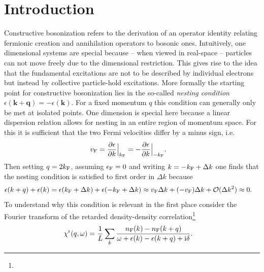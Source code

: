 \documentclass[english, parskip=full]{scrartcl}
\title{\titel}
\author{\autor}
\date{\today}
\begin{document}
\maketitle  %


\section{Introduction}
Constructive bosonization refers to the derivation of an operator identity relating fermionic creation and annihilation operators to bosonic ones.
Intuitively, one dimensional systems are special because -- when viewed in real-space -- particles can not move freely due to the dimensional restriction.
This gives rise to the idea that the fundamental excitations are not to be described by individual electrons but instead by collective particle-hold excitations.
More formally the starting point for constructive bosonization lies in the so-called \emph{nesting condition} $\epsilon(\textbf{k}+\textbf{q}) = -\epsilon(\textbf{k})$.
For a fixed momentum $q$ this condition can generally only be met at isolated points.
One dimension is special here because a linear dispersion relation allows for nesting in an entire region of momentum space.
For this it is sufficient that the two Fermi velocities differ by a minus sign, i.e.
\begin{align}
v_{\text{F}} &= \frac{\partial\epsilon}{\partial k} \Big\vert_{k_{\text{F}}} = -\frac{\partial\epsilon}{\partial k} \Big\vert_{-k_{\text{F}}} .
\end{align}
Then setting $q=2k_{\text{F}}$, assuming $\epsilon_{\text{F}}=0$ and writing $k=-k_{\text{F}} + \Delta k$ one finds that the nesting condition is satisfied to first order in $\Delta k$ because
\begin{align}
\epsilon(k+q) + \epsilon(k) &= \epsilon(k_{\text{F}} + \Delta k) + \epsilon(-k_{\text{F}} + \Delta k) \approx v_{\text{F}}\Delta k + (-v_{\text{F}}) \Delta k + \mathcal{O}(\Delta k^2) \approx 0.
\end{align}
To understand why this condition is relevant in the first place consider the Fourier transform of the retarded density-density correlation\footnote{}
\begin{align}
\chi^{\text{r}}(q,\omega) &= \frac{1}{L} \sum_k \frac{n_{\text{F}}(k) - n_{\text{F}}(k+q)}{\omega + \epsilon(k) - \epsilon(k+q) + \text{i}\delta}.
\end{align}
\end{document}
